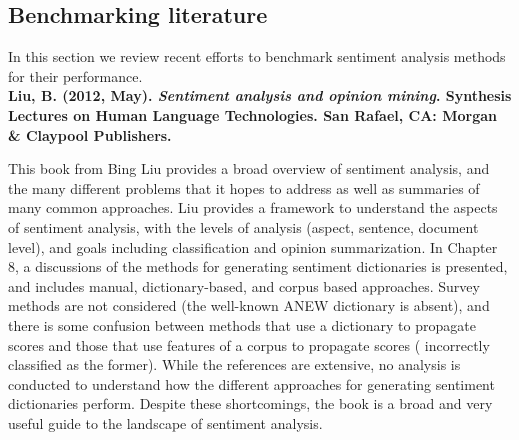 {%


\subsection{Benchmarking literature}

In this section we review recent efforts to benchmark sentiment analysis methods for their performance.\\


\noindent \textbf{Liu, B. (2012, May).
{\em Sentiment analysis and opinion mining}.
Synthesis Lectures on Human Language Technologies. San Rafael, CA:
Morgan \& Claypool Publishers.}

\noindent This book from Bing Liu provides a broad overview of sentiment analysis, and the many different problems that it hopes to address as well as summaries of many common approaches.
Liu provides a framework to understand the aspects of sentiment analysis, with the levels of analysis (aspect, sentence, document level), and goals including classification and opinion summarization.
In Chapter 8, a discussions of the methods for generating sentiment dictionaries is presented, and includes manual, dictionary-based, and corpus based approaches.
Survey methods are not considered (the well-known ANEW dictionary is absent), and there is some confusion between methods that use a dictionary to propagate scores and those that use features of a corpus to propagate scores (\cite{velikovich2010viability} incorrectly classified as the former).
While the references are extensive, no analysis is conducted to understand how the different approaches for generating sentiment dictionaries perform.
Despite these shortcomings, the book is a broad and very useful guide to the landscape of sentiment analysis.\\

}
